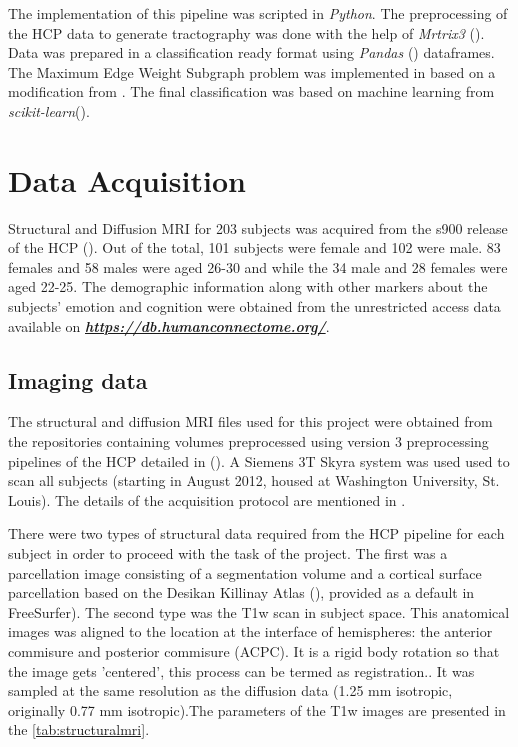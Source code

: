 \documentclass[msthesis.tex]{subfiles}
\begin{document}
The implementation of this pipeline was scripted in \textit{Python}. The preprocessing of the HCP data to generate tractography was done with the help of \textit{Mrtrix3} (\cite{tournier2019mrtrix3}).  Data was prepared in a classification ready format using \textit{Pandas} (\cite{pandas_2020}) dataframes. The Maximum Edge Weight Subgraph problem was implemented in  based on a modification from \cite{DBLP:journals/corr/LobodaAS16}. The final classification was based on machine learning from \textit{scikit-learn}(\cite{sklearn_2012}). 

\section{Data Acquisition}
\label{sec:acquisition}
Structural and Diffusion MRI for 203 subjects was acquired from the s900 release of the HCP (\cite{hcp2015wu}). Out of the total, 101 subjects were female and 102 were male. 83 females and 58 males were aged 26-30 and while the 34 male and 28 females were aged 22-25. The demographic information along with other markers about the subjects' emotion and cognition were obtained from the unrestricted access data available on \href{https://db.humanconnectome.org/}{\textbf{\textit{https://db.humanconnectome.org/}}}.

\subsection{Imaging data}
The structural and diffusion MRI files used for this project were obtained from the repositories containing volumes preprocessed using version 3 preprocessing pipelines of the HCP detailed in (\cite{GLASSER2013105}). A Siemens 3T Skyra system was used used to scan all subjects (starting in August 2012, housed at Washington University, St. Louis). The details of the acquisition protocol are mentioned in \cite{van2012human}.


There were two types of structural data required from the HCP pipeline for each subject in order to proceed with the task of the project. The first was a parcellation image consisting of a segmentation volume and a cortical surface parcellation based on the Desikan Killinay Atlas (\cite{desikan2006automated}), provided as a default in FreeSurfer). The second type was the T1w scan in subject space. This anatomical images was aligned to the location at the interface of hemispheres: the anterior commisure and posterior commisure (ACPC). It is a rigid body rotation so that the image gets 'centered', this process can be termed as registration.. It was sampled at the same resolution as the diffusion data (1.25 mm isotropic, originally 0.77 mm isotropic).The parameters of the T1w images are presented in the \autoref{tab:structuralmri}.
\end{document}
